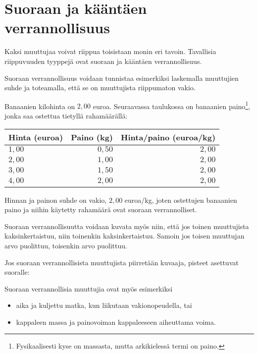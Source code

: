 \chapter{Suoraan ja kääntäen verrannollisuus}

Kaksi muuttujaa voivat riippua toisistaan monin eri tavoin. Tavallisia
riippuvuuden tyyppejä ovat suoraan ja kääntäen verrannollisuus.


Suoraan verrannollisuus voidaan tunnistaa esimerkiksi laskemalla muuttujien
suhde ja toteamalla, että se on muuttujista riippumaton vakio.

\begin{esimerkki}
Banaanien kilohinta on $2,00$ euroa. Seuraavassa taulukossa on
banaanien paino\footnote{Fysikaalisesti kyse on massasta, mutta
arkikielessä termi on paino.}, jonka saa ostettua tietyllä rahamäärällä:
\begin{center} 
\begin{tabular}{|l|r|r|}
\hline
Hinta (euroa) & Paino (kg) & Hinta/paino (euroa/kg) \\
\hline
$1,00$ & $0,50$ & $2,00$ \\
$2,00$ & $1,00$ & $2,00$ \\
$3,00$ & $1,50$ & $2,00$ \\
$4,00$ & $2,00$ & $2,00$ \\
\hline
\end{tabular}
\end{center}
Hinnan ja painon suhde on vakio, $2,00$ euroa/kg, joten ostettujen
banaanien paino ja niihin käytetty rahamäärä ovat suoraan verrannolliset.
\end{esimerkki}

Suoraan verrannollisuutta voidaan kuvata myös niin, että jos
toinen muuttujista kaksinkertaistuu, niin toinenkin kaksinkertaistuu.
Samoin jos toisen muuttujan arvo puolittuu, toisenkin arvo puolittuu.

Jos suoraan verrannollisista muuttujista piirretään kuvaaja, pisteet
asettuvat suoralle:


Suoraan verrannollisia muuttujia ovat myös esimerkiksi
\begin{itemize}
    \item aika ja kuljettu matka, kun liikutaan vakionopeudella, tai
    \item kappaleen massa ja painovoiman kappaleeseen aiheuttama voima.
\end{itemize}

